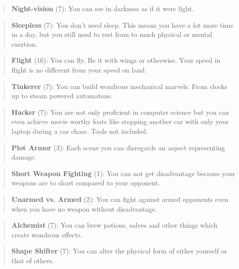 \documentclass[11pt]{article}
\begin{document}
{\begin{quote}
\textbf{Night-vision} (7): You can see in darkness as if it were light.
\end{quote}

\begin{quote}
\textbf{Sleepless} (7): You don't need sleep. This means you have a lot more time in a day, but you still need to rest from to much physical or mental exertion.
\end{quote}

\begin{quote}
\textbf{Flight} (16): You can fly. Be it with wings or otherwise. Your speed in flight is no different from your speed on land.
\end{quote}

\begin{quote}
\textbf{Tinkerer} (7): You can build wondrous mechanical marvels. From clocks up to steam powered automatons. 
\end{quote}

\begin{quote}
\textbf{Hacker} (7): You are not only proficient in computer science but you can even achieve movie worthy feats like stopping another car with only your laptop during a car chase. Tools not included.
\end{quote}

\begin{quote}
\textbf{Plot Armor} (3): Each scene you can disregards an aspect representing damage. 
\end{quote}

\begin{quote}
\textbf{Short Weapon Fighting} (1): You can not get disadvantage because your weapons are to short compared to your opponent.
\end{quote}

\begin{quote}
\textbf{Unarmed vs. Armed} (2): You can fight against armed opponents even when you have no weapon without disadvantage.
\end{quote}

\begin{quote}
\textbf{Alchemist} (7): You can brew potions, salves and other things which create wondrous effects.
\end{quote}

\begin{quote}
\textbf{Shape Shifter} (7): You can alter the physical form of either yourself or that of others.
\end{quote}

}
\end{document}
